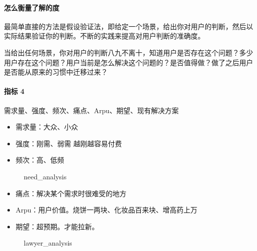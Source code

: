 \documentclass[letterpaper,11pt,english]{sphinxmanual}
\begin{document}
\paragraph{怎么衡量了解的度}
\label{\detokenize{chapter_skill/users_analysis:id15}}
最简单直接的方法是假设验证法，即给定一个场景，给出你对用户的判断，然后以实际结果验证你的判断。不断的实践来提高对用户判断的准确度。

当给出任何场景，你对用户的判断八九不离十，知道用户是否存在这个问题？多少用户存在这个问题？用户当前是怎么解决这个问题的？是否值得做？做了之后用户是否能从原来的习惯中迁移过来？


\paragraph{指标 4\sphinxfootnotemark[158]}
\label{\detokenize{chapter_skill/users_analysis:id16}}%
\begin{footnotetext}[158]\sphinxAtStartFootnote
{}
%
\end{footnotetext}\ignorespaces 
需求量、强度、频次、痛点、Arpu、期望、现有解决方案
\begin{itemize}
\item {} 
需求量：大众、小众

\item {} 
强度：刚需、弱需 越刚越容易付费

\item {} 
频次：高、低频

\end{itemize}

\begin{figure}[H]
\centering
\capstart

\noindent{}
\caption{need\_analysis}\label{\detokenize{chapter_skill/users_analysis:id30}}\end{figure}
\begin{itemize}
\item {} 
痛点：解决某个需求时很难受的地方

\item {} 
Arpu：用户价值。烧饼一两块、化妆品百来块、增高药上万

\item {} 
期望：超预期。才能拉新。

\end{itemize}

\begin{figure}[H]
\centering
\capstart

\noindent{}
\caption{lawyer\_analysis}\label{\detokenize{chapter_skill/users_analysis:id31}}\end{figure}
\end{document}
